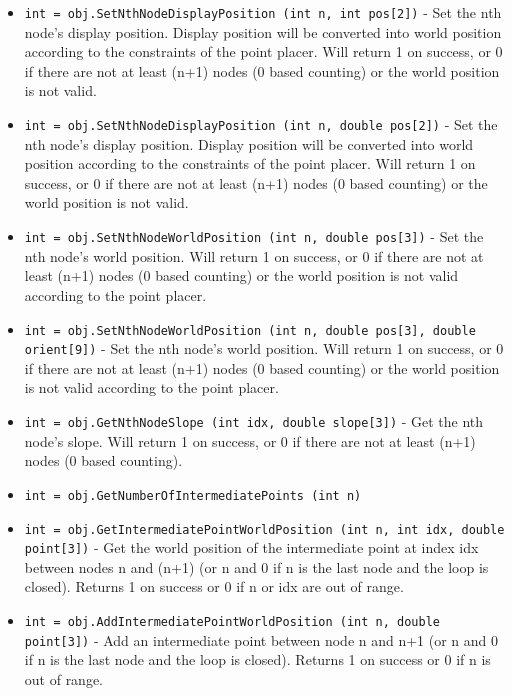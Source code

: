 \begin{itemize}
\item  \verb|int = obj.SetNthNodeDisplayPosition (int n, int pos[2])| -  Set the nth node's display position. Display position
 will be converted into world position according to the
 constraints of the point placer. Will return
 1 on success, or 0 if there are not at least 
 (n+1) nodes (0 based counting) or the world position
 is not valid.

\item  \verb|int = obj.SetNthNodeDisplayPosition (int n, double pos[2])| -  Set the nth node's display position. Display position
 will be converted into world position according to the
 constraints of the point placer. Will return
 1 on success, or 0 if there are not at least 
 (n+1) nodes (0 based counting) or the world position
 is not valid.

\item  \verb|int = obj.SetNthNodeWorldPosition (int n, double pos[3])| -  Set the nth node's world position. Will return
 1 on success, or 0 if there are not at least 
 (n+1) nodes (0 based counting) or the world
 position is not valid according to the point
 placer.

\item  \verb|int = obj.SetNthNodeWorldPosition (int n, double pos[3], double orient[9])| -  Set the nth node's world position. Will return
 1 on success, or 0 if there are not at least 
 (n+1) nodes (0 based counting) or the world
 position is not valid according to the point
 placer.

\item  \verb|int = obj.GetNthNodeSlope (int idx, double slope[3])| -  Get the nth node's slope. Will return
 1 on success, or 0 if there are not at least 
 (n+1) nodes (0 based counting).

\item  \verb|int = obj.GetNumberOfIntermediatePoints (int n)|

\item  \verb|int = obj.GetIntermediatePointWorldPosition (int n, int idx, double point[3])| -  Get the world position of the intermediate point at
 index idx between nodes n and (n+1) (or n and 0 if
 n is the last node and the loop is closed). Returns
 1 on success or 0 if n or idx are out of range.

\item  \verb|int = obj.AddIntermediatePointWorldPosition (int n, double point[3])| -  Add an intermediate point between node n and n+1
 (or n and 0 if n is the last node and the loop is closed).
 Returns 1 on success or 0 if n is out of range.


\end{itemize}

